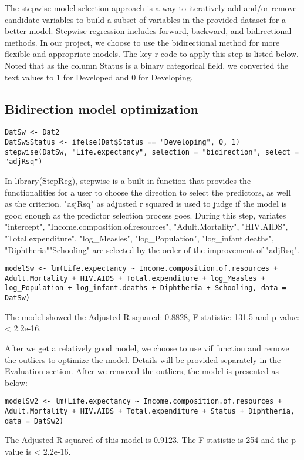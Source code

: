 The stepwise model selection approach is a way to iteratively add and/or remove candidate variables to build a subset of variables in the provided dataset for a better model. Stepwise regression includes forward, backward, and bidirectional methods. In our project, we choose to use the bidirectional method for more flexible and appropriate models. The key r code to apply this step is listed below. Noted that as the column Status is a binary categorical field, we converted the text values to 1 for Developed and 0 for Developing.

\subsection{Bidirection model optimization}

\begin{verbatim}
DatSw <- Dat2
DatSw$Status <- ifelse(Dat$Status == "Developing", 0, 1)
stepwise(DatSw, "Life.expectancy", selection = "bidirection", select = "adjRsq")
\end{verbatim}
In library(StepReg), stepwise is a built-in function that provides the functionalities for a user to choose the direction to select the predictors, as well as the criterion. "asjRsq" as adjusted r squared is used to judge if the model is good enough as the predictor selection process goes. During this step, variates "intercept", "Income.composition.of.resources", "Adult.Mortality", "HIV.AIDS", "Total.expenditure", "log\_Measles", "log\_Population", "log\_infant.deaths", "Diphtheria""Schooling" are selected by the order of the improvement of "adjRsq".

\begin{verbatim}
modelSw <- lm(Life.expectancy ~ Income.composition.of.resources + Adult.Mortality + HIV.AIDS + Total.expenditure + log_Measles + log_Population + log_infant.deaths + Diphtheria + Schooling, data = DatSw)
\end{verbatim}
The model showed the Adjusted R-squared:  0.8828, F-statistic: 131.5 and p-value: < 2.2e-16.

After we get a relatively good model, we choose to use vif function and remove the outliers to optimize the model. Details will be provided separately in the Evaluation section. After we removed the outliers, the model is presented as below:

\begin{verbatim}
modelSw2 <- lm(Life.expectancy ~ Income.composition.of.resources + Adult.Mortality + HIV.AIDS + Total.expenditure + Status + Diphtheria, data = DatSw2)
\end{verbatim}
The Adjusted R-squared of this model is 0.9123. The F-statistic is 254 and the p-value is < 2.2e-16. 

